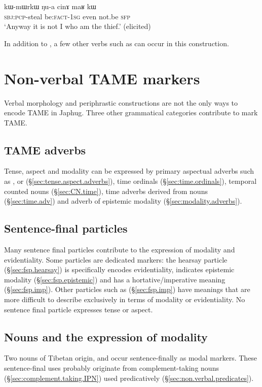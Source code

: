 \begin{exe}
	\ex \label{ex:Nua.cinA.maR.kW}
	\gll  kɯ-mɯrkɯ ŋu-a cinɤ maʁ kɯ  \\
	\textsc{sbj}:\textsc{pcp}-steal be:\textsc{fact}-\textsc{1sg} even not.be \textsc{sfp} \\
	\glt `Anyway it is not I who am the thief.' (elicited)
\end{exe}

In addition to , a few other verbs such as  can occur in this construction.

\section{Non-verbal TAME markers}  \label{sec:non.verb.TAME}
Verbal morphology and periphrastic constructions are not the only ways to encode TAME in Japhug. Three other grammatical categories contribute to mark TAME. 


\subsection{TAME adverbs} 
Tense, aspect and modality can be expressed by primary aspectual adverbs such as ,  or  (§\ref{sec:tense.aspect.adverbs}), time ordinals (§\ref{sec:time.ordinals}), temporal counted nouns (§\ref{sec:CN.time}), time adverbs derived from nouns (§\ref{sec:time.adv}) and adverb of epistemic modality (§\ref{sec:modality.adverbs}).


\subsection{Sentence-final particles} 
Many sentence final particles contribute to the expression of modality and evidentiality. Some particles are dedicated markers: the hearsay particle  (§\ref{sec:fsp.hearsay}) is specifically encodes evidentiality,   indicates epistemic modality (§\ref{sec:fsp.epistemic}) and  has a hortative/imperative meaning (§\ref{sec:fsp.imp}). Other particles such as  (§\ref{sec:fsp.imp}) have meanings that are more difficult to describe exclusively in terms of modality or evidentiality. No sentence final particle expresses tense or aspect.


\subsection{Nouns and the expression of modality} \label{sec:nouns.TAME}
Two nouns of Tibetan origin,  and  occur sentence-finally as modal markers. These sentence-final uses probably originate from complement-taking nouns (§\ref{sec:complement.taking.IPN}) used predicatively (§\ref{sec:non.verbal.predicates}).

